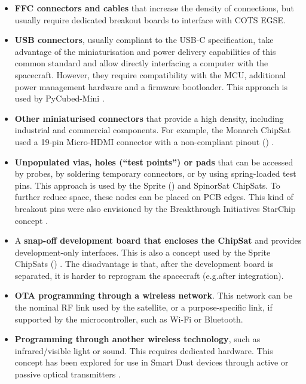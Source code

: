 \documentclass[a4paper,nobib,justified,final]{tufte-book}
\begin{document}
\begin{itemize}
	\item \textbf{\acf{FFC} connectors and cables} that increase the density of connections, but usually require dedicated breakout boards to interface with \acs{COTS} \acs{EGSE}.
	\item \textbf{\acs{USB} connectors}, usually compliant to the USB-C specification, take advantage of the miniaturisation and power delivery capabilities of this common standard and allow directly interfacing a computer with the spacecraft. However, they require compatibility with the \acs{MCU}, additional power management hardware and a firmware bootloader. This approach is used by PyCubed-Mini \autocite{manchesterPyCubedMini}.
	\item \textbf{Other miniaturised connectors} that provide a high density, including industrial and commercial components. For example, the Monarch ChipSat used a 19-pin Micro-HDMI connector with a non-compliant pinout () \autocite{adamsRSelectedSpacecraft2019}.
	\item \textbf{Unpopulated vias, holes (``test points'') or pads} that can be accessed by probes, by soldering temporary connectors, or by using spring-loaded test pins. This approach is used by the Sprite () \autocite{manchesterCentimeterScaleSpacecraftDesign2015} and SpinorSat \autocite{brashearsSpinorSatStep502018} ChipSats. To further reduce space, these nodes can be placed on \acs{PCB} edges. This kind of breakout pins were also envisioned by the Breakthrough Initiatives StarChip concept \autocite{wordenBreakthroughPrizes2017}. 
	\item A \textbf{snap-off development board that encloses the ChipSat} and provides development-only interfaces. This is also a concept used by the Sprite ChipSats () \autocite{manchesterCentimeterScaleSpacecraftDesign2015}. The disadvantage is that, after the development board is separated, it is harder to reprogram the spacecraft (e.g.\space after integration).
	\item \textbf{\acf{OTA} programming through a wireless network}. This network can be the nominal \acs{RF} link used by the satellite, or a purpose-specific link, if supported by the microcontroller, such as Wi-Fi or Bluetooth. %
	\item \textbf{Programming through another wireless technology}, such as infrared/visible light or sound. This requires dedicated hardware. This concept has been explored for use in Smart Dust devices through active or passive optical transmitters \autocite{warnekeSmartDustCommunicating2001}.
\end{itemize}
\end{document}
